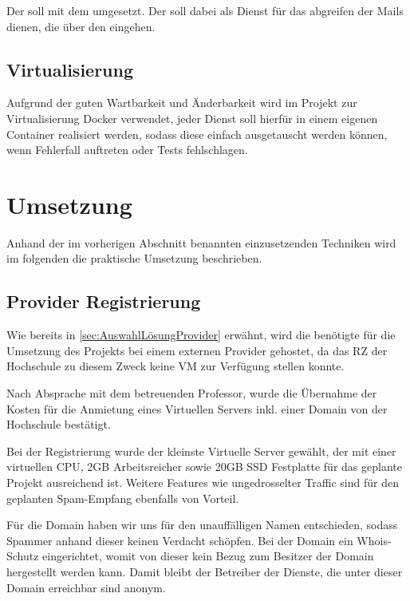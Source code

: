 \documentclass[a4paper,11pt,singlespacing]{article}
\begin{document}
	Der  soll mit dem  umgesetzt. Der  soll dabei als Dienst für das abgreifen der Mails dienen, die über den  eingehen.
		
		
	\subsection{Virtualisierung}\label{sec:AuswahlLösungVirtualisierung}
		Aufgrund der guten Wartbarkeit und Änderbarkeit wird im Projekt zur Virtualisierung Docker verwendet, jeder Dienst soll hierfür in einem eigenen Container realisiert werden, sodass diese einfach ausgetauscht werden können, wenn Fehlerfall auftreten oder Tests fehlschlagen.

\newpage


\section{Umsetzung}\label{sec:Umsetzung}
	Anhand der im vorherigen Abschnitt benannten einzusetzenden Techniken wird im folgenden die praktische Umsetzung beschrieben.
	
	\subsection{Provider Registrierung}\label{sec:ProviderRegistrierung} 
		Wie bereits in \autoref{sec:AuswahlLösungProvider} erwähnt, wird die benötigte  für die Umsetzung des Projekts bei einem externen Provider gehostet, da das RZ der Hochschule zu diesem Zweck keine VM zur Verfügung stellen konnte.
		
		Nach Absprache mit dem betreuenden Professor, wurde die Übernahme der Kosten für die Anmietung eines Virtuellen Servers inkl. einer Domain von der Hochschule bestätigt.  
		
		Bei der Registrierung wurde der kleinste Virtuelle Server gewählt, der mit einer virtuellen CPU, 2GB Arbeitsreicher sowie 20GB SSD Festplatte für das geplante Projekt ausreichend ist. Weitere Features wie ungedrosselter Traffic sind für den geplanten Spam-Empfang ebenfalls von Vorteil.
		
		Für die Domain haben wir uns für den unauffälligen Namen entschieden, sodass Spammer anhand dieser keinen Verdacht schöpfen. Bei der Domain ein Whois-Schutz eingerichtet, womit von dieser kein Bezug zum Besitzer der Domain hergestellt werden kann. Damit bleibt der Betreiber der Dienste, die unter dieser Domain erreichbar sind anonym.
		
\end{document}
